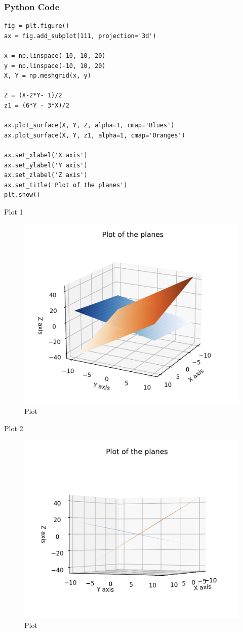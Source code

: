 \documentclass{beamer}
\begin{document}
\begin{frame}[fragile]
    \frametitle{Python Code}

    \begin{lstlisting}
fig = plt.figure()
ax = fig.add_subplot(111, projection='3d')

x = np.linspace(-10, 10, 20)
y = np.linspace(-10, 10, 20)
X, Y = np.meshgrid(x, y)

Z = (X-2*Y- 1)/2
z1 = (6*Y - 3*X)/2

ax.plot_surface(X, Y, Z, alpha=1, cmap='Blues')
ax.plot_surface(X, Y, z1, alpha=1, cmap='Oranges')

ax.set_xlabel('X axis')
ax.set_ylabel('Y axis')
ax.set_zlabel('Z axis')
ax.set_title('Plot of the planes')
plt.show()

    \end{lstlisting}
\end{frame}


\begin{frame}{Plot 1}
\begin{figure}
    \centering
    \includegraphics[width=0.8\columnwidth]{Figs/Figure_3.2.png}
    \caption{Plot}
    \label{fig:placeholder}
\end{figure}
\end{frame}

\begin{frame}{Plot 2}
\begin{figure}
    \centering
    \includegraphics[width=0.8\columnwidth]{Figs/Figure_3.1.png}
    \caption{Plot}
    \label{fig:placeholder}
\end{figure}
\end{frame}
\end{document}
